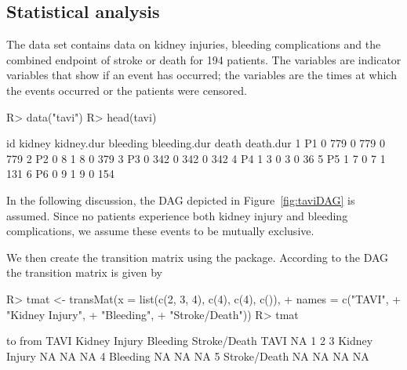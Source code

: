 \subsection{Statistical analysis}

The  data set contains data on kidney injuries, bleeding complications and the combined endpoint of stroke or death for 194 patients. The variables  are indicator variables that show if an event has occurred; the variables  are the times at which the events occurred or the patients were censored. 
\begin{Schunk}
\begin{Sinput}
R>   data("tavi")
R>   head(tavi)
\end{Sinput}
\begin{Soutput}
  id kidney kidney.dur bleeding bleeding.dur death death.dur
1 P1      0        779        0          779     0       779
2 P2      0          8        1            8     0       379
3 P3      0        342        0          342     0       342
4 P4      1          3        0            3     0        36
5 P5      1          7        0            7     1       131
6 P6      0          9        1            9     0       154
\end{Soutput}
\end{Schunk}

In the following discussion, the DAG depicted in Figure~\ref{fig:taviDAG} is assumed. Since no patients experience both kidney injury and bleeding complications, we assume these events to be mutually exclusive.


We then create the transition matrix using the  package. According to the DAG the transition matrix is given by
\begin{Schunk}
\begin{Sinput}
R>   tmat <- transMat(x = list(c(2, 3, 4), c(4), c(4), c()), 
+                  names = c("TAVI", 
+                            "Kidney Injury", 
+                            "Bleeding", 
+                            "Stroke/Death"))
R>   tmat
\end{Sinput}
\begin{Soutput}
               to
from            TAVI Kidney Injury Bleeding Stroke/Death
  TAVI            NA             1        2            3
  Kidney Injury   NA            NA       NA            4
  Bleeding        NA            NA       NA            5
  Stroke/Death    NA            NA       NA           NA
\end{Soutput}
\end{Schunk}

